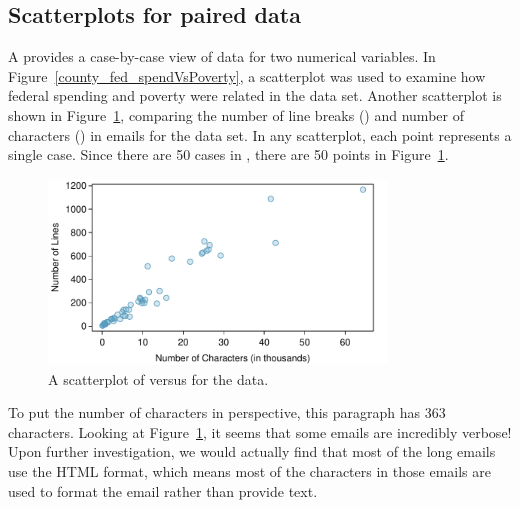 \subsection{Scatterplots for paired data}
\label{scatterPlots}


A  provides a case-by-case view of data for two numerical variables. In Figure~\vref{county_fed_spendVsPoverty}, a scatterplot was used to examine how federal spending and poverty were related in the  data set. Another scatterplot is shown in Figure~\ref{email50LinesCharacters}, comparing the number of line breaks () and number of characters () in emails for the  data set. In any scatterplot, each point represents a single case. Since there are 50 cases in , there are 50 points in Figure~\ref{email50LinesCharacters}.

\textC{\setlength{\captionwidth}{0.9\textwidth}}

\begin{figure}[h]
   \centering
   \includegraphics[width=0.8\textwidth]{ch_intro_to_data/figures/email50LinesCharacters/email50LinesCharacters}
   \caption{A scatterplot of  versus  for the  data.}
   \label{email50LinesCharacters}
\end{figure}

\textC{\setlength{\captionwidth}{\mycaptionwidth}}

To put the number of characters in perspective, this paragraph has 363 characters. Looking at Figure~\ref{email50LinesCharacters}, it seems that some emails are incredibly verbose! Upon further investigation, we would actually find that most of the long emails use the HTML format, which means most of the characters in those emails are used to format the email rather than provide text.

